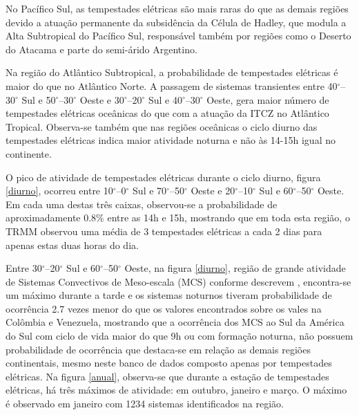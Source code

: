 No Pacífico Sul, as tempestades elétricas são mais raras do que as demais regiões devido a atuação permanente da subsidência da Célula de Hadley, que modula a Alta Subtropical do Pacífico Sul, responsável também por regiões como o Deserto do Atacama e parte do semi-árido Argentino.

Na região do Atlântico Subtropical, a probabilidade de tempestades elétricas é maior do que no Atlântico Norte. A passagem de sistemas transientes entre 40$^{\circ}$--30$^{\circ}$ Sul e 50$^{\circ}$--30$^{\circ}$ Oeste e 30$^{\circ}$--20$^{\circ}$ Sul e 40$^{\circ}$--30$^{\circ}$ Oeste, gera maior número de tempestades elétricas oceânicas do que com a atuação da ITCZ no Atlântico Tropical. Observa-se também que nas regiões oceânicas o ciclo diurno das tempestades elétricas indica maior atividade noturna e não às 14-15h igual no continente.


O pico de atividade de tempestades elétricas durante o ciclo diurno, figura \ref{diurno}, ocorreu entre 10$^{\circ}$--0$^{\circ}$ Sul e 70$^{\circ}$--50$^{\circ}$ Oeste e 20$^{\circ}$--10$^{\circ}$ Sul e 60$^{\circ}$--50$^{\circ}$ Oeste. Em cada uma destas três caixas, observou-se a probabilidade de aproximadamente 0.8\% entre as 14h e 15h, mostrando que em toda esta região, o TRMM observou uma média de 3 tempestades elétricas a cada 2 dias para apenas estas duas horas do dia.


Entre 30$^{\circ}$--20$^{\circ}$ Sul e 60$^{\circ}$--50$^{\circ}$ Oeste, na figura \ref{diurno}, região de grande atividade de Sistemas Convectivos de Meso-escala (MCS) conforme descrevem , encontra-se um máximo durante a tarde e os sistemas noturnos tiveram probabilidade de ocorrência 2.7 vezes menor do que os valores encontrados sobre os vales na Colômbia e Venezuela, mostrando que a ocorrência dos MCS ao Sul da América do Sul com ciclo de vida maior do que 9h ou com formação noturna, não possuem probabilidade de ocorrência que destaca-se em relação as demais regiões continentais, mesmo neste banco de dados composto apenas por tempestades elétricas. Na figura \ref{anual}, observa-se que durante a estação de tempestades elétricas, há três máximos de atividade: em outubro, janeiro e março. O máximo é observado em janeiro com 1234 sistemas identificados na região.	

